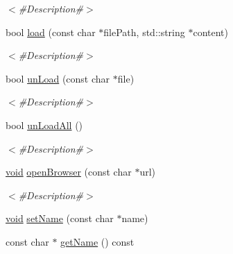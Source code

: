 \begin{DoxyCompactItemize}
\begin{DoxyCompactList}\small\item\em $<$\#\+Description\#$>$ \end{DoxyCompactList}\item 
bool \mbox{\hyperlink{classnjli_1_1_world_resource_loader_aec886dbf078e7880babb4b678a31d030}{load}} (const char $\ast$file\+Path, std\+::string $\ast$content)
\begin{DoxyCompactList}\small\item\em $<$\#\+Description\#$>$ \end{DoxyCompactList}\item 
bool \mbox{\hyperlink{classnjli_1_1_world_resource_loader_a565f073cdac67831e15fa9020da10012}{un\+Load}} (const char $\ast$file)
\begin{DoxyCompactList}\small\item\em $<$\#\+Description\#$>$ \end{DoxyCompactList}\item 
bool \mbox{\hyperlink{classnjli_1_1_world_resource_loader_a86cdad587fb6ef372c4dcac741a5fa73}{un\+Load\+All}} ()
\begin{DoxyCompactList}\small\item\em $<$\#\+Description\#$>$ \end{DoxyCompactList}\item 
\mbox{\hyperlink{_thread_8h_af1e856da2e658414cb2456cb6f7ebc66}{void}} \mbox{\hyperlink{classnjli_1_1_world_resource_loader_ae5e984513ae702c34e193d39f5c8a763}{open\+Browser}} (const char $\ast$url)
\begin{DoxyCompactList}\small\item\em $<$\#\+Description\#$>$ \end{DoxyCompactList}\item 
\mbox{\hyperlink{_thread_8h_af1e856da2e658414cb2456cb6f7ebc66}{void}} \mbox{\hyperlink{classnjli_1_1_world_resource_loader_a087eb5f8d9f51cc476f12f1d10a3cb95}{set\+Name}} (const char $\ast$name)
\item 
const char $\ast$ \mbox{\hyperlink{classnjli_1_1_world_resource_loader_ad41266885be835f3ee602311e20877a4}{get\+Name}} () const
\end{DoxyCompactItemize}
